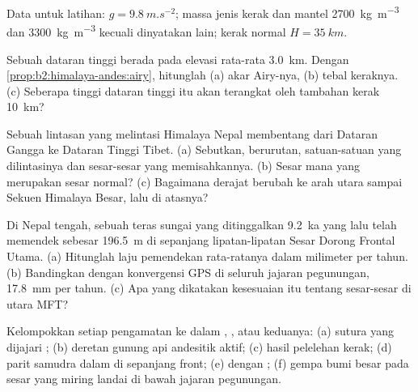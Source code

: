 Data untuk latihan: $g = \qty{9.8}{m.s^{-2}}$; massa jenis kerak dan mantel
\qty{2700}{kg.m^{-3}} dan \qty{3300}{kg.m^{-3}} kecuali dinyatakan lain; kerak normal $H =
\qty{35}{km}$.

\begin{exercise}[$\star$]\label{exo:b2:himalaya-andes:1}
Sebuah dataran tinggi berada pada elevasi rata-rata \qty{3.0}{km}. Dengan
\cref{prop:b2:himalaya-andes:airy}, hitunglah (a) akar Airy-nya, (b) tebal keraknya.
(c) Seberapa tinggi dataran tinggi itu akan terangkat oleh tambahan kerak \qty{10}{km}?
\end{exercise}

\begin{exercise}[$\star$]\label{exo:b2:himalaya-andes:2}
Sebuah lintasan yang melintasi Himalaya Nepal membentang dari Dataran Gangga ke Dataran Tinggi Tibet.
(a) Sebutkan, berurutan, satuan-satuan yang dilintasinya dan sesar-sesar yang memisahkannya. (b) Sesar mana
yang merupakan sesar normal? (c) Bagaimana derajat  berubah ke arah utara sampai Sekuen Himalaya
Besar, lalu di atasnya?
\end{exercise}

\begin{exercise}[$\star$]\label{exo:b2:himalaya-andes:3}
Di Nepal tengah, sebuah teras sungai yang ditinggalkan \qty{9.2}{ka} yang lalu telah memendek sebesar
\qty{196.5}{m} di sepanjang lipatan-lipatan Sesar Dorong Frontal Utama. (a) Hitunglah laju pemendekan
rata-ratanya dalam milimeter per tahun. (b) Bandingkan dengan konvergensi GPS di seluruh jajaran pegunungan,
\qty{17.8}{mm} per tahun. (c) Apa yang dikatakan kesesuaian itu tentang sesar-sesar di utara MFT?
\end{exercise}

\begin{exercise}[$\star$]\label{exo:b2:himalaya-andes:4}
Kelompokkan setiap pengamatan ke dalam , , atau keduanya: (a) sutura yang dijajari
; (b) deretan gunung api andesitik aktif; (c)  hasil pelelehan
kerak; (d) parit samudra dalam di sepanjang front; (e)  dengan ;
(f) gempa bumi besar pada sesar yang miring landai di bawah jajaran pegunungan.
\end{exercise}

